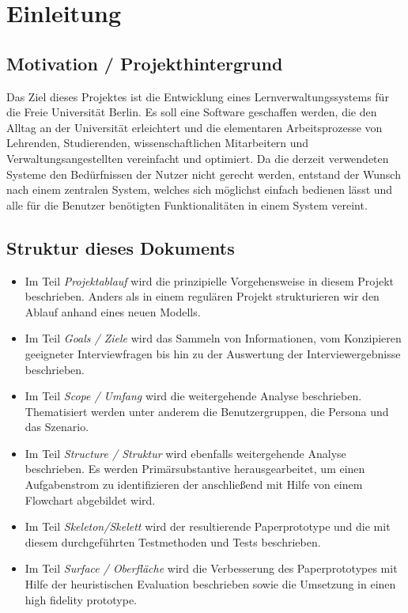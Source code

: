 \documentclass{article}
\begin{document}
\newpage

\section{Einleitung}

\subsection{Motivation / Projekthintergrund}

Das Ziel dieses Projektes ist die Entwicklung eines Lernverwaltungssystems für die Freie Universität Berlin.
Es soll eine Software geschaffen werden, die den Alltag an der Universität erleichtert und die elementaren Arbeitsprozesse von Lehrenden, Studierenden, wissenschaftlichen Mitarbeitern und Verwaltungsangestellten vereinfacht und optimiert.
Da die derzeit verwendeten Systeme den Bedürfnissen der Nutzer nicht gerecht werden, entstand der Wunsch nach einem zentralen System, welches sich möglichst einfach bedienen lässt und alle für die Benutzer benötigten Funktionalitäten in einem System vereint. 

\subsection{Struktur dieses Dokuments}

\begin{itemize}
\item Im Teil \textit{Projektablauf} wird die prinzipielle Vorgehensweise in diesem Projekt beschrieben. Anders als in einem regulären Projekt strukturieren wir den Ablauf anhand eines neuen Modells.
\item Im Teil \textit{Goals / Ziele} wird das Sammeln von Informationen, vom Konzipieren geeigneter Interviewfragen bis hin zu der Auswertung der Interviewergebnisse beschrieben.
\item Im Teil \textit{Scope / Umfang} wird die weitergehende Analyse beschrieben. Thematisiert werden unter anderem die Benutzergruppen, die Persona und das Szenario.
\item Im Teil \textit{Structure / Struktur} wird ebenfalls weitergehende Analyse beschrieben. Es werden Primärsubstantive herausgearbeitet, um einen Aufgabenstrom zu identifizieren der anschließend mit Hilfe von einem Flowchart abgebildet wird.
\item Im Teil \textit{Skeleton/Skelett} wird der resultierende Paperprototype und die mit diesem durchgeführten Testmethoden und Tests beschrieben.
\item Im Teil \textit{Surface / Oberfläche} wird die Verbesserung des Paperprototypes mit Hilfe der heuristischen Evaluation beschrieben sowie die Umsetzung in einen high fidelity prototype.
\end{itemize}
\end{document}
